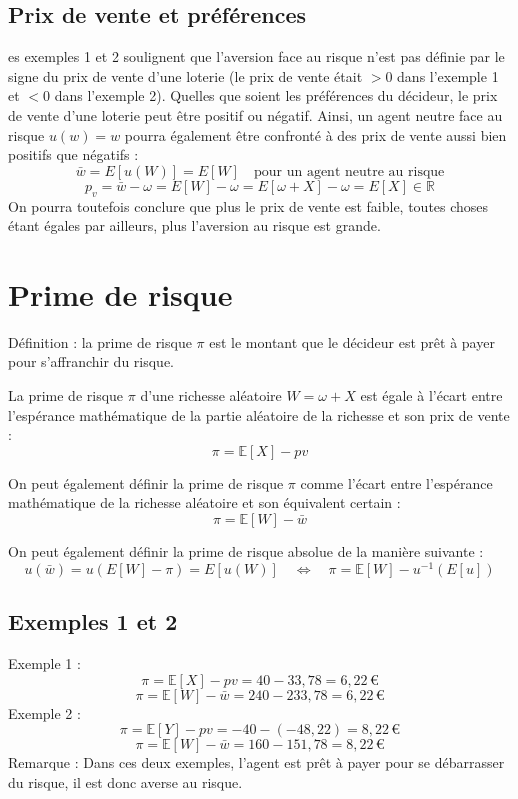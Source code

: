 \documentclass[a4paper, 12pt]{report}
\begin{document}
\subsection{Prix de vente et préférences}

es exemples 1 et 2 soulignent que l'aversion face au risque n'est pas définie par le signe du prix de vente d'une loterie (le prix de vente était \( > 0 \) dans l'exemple 1 et \( < 0 \) dans l'exemple 2). Quelles que soient les préférences du décideur, le prix de vente d'une loterie peut être positif ou négatif. Ainsi, un agent neutre face au risque \( u(w) = w \) pourra également être confronté à des prix de vente aussi bien positifs que négatifs : 
\[
\bar{w} = E[u(W)] = E[W] \quad \text{pour un agent neutre au risque}
\]
\[
p_v = \bar{w} - \omega = E[W] - \omega = E[\omega + X] - \omega = E[X] \in \mathbb{R}
\]
On pourra toutefois conclure que plus le prix de vente est faible, toutes choses étant égales par ailleurs, plus l'aversion au risque est grande.

\section{Prime de risque}

Définition : la prime de risque \( \pi \) est le montant que le décideur est prêt à payer pour s'affranchir du risque.

La prime de risque \( \pi \) d'une richesse aléatoire \( W = \omega + X \) est égale à l'écart entre l'espérance mathématique de la partie aléatoire de la richesse et son prix de vente :
\[
\pi = \mathbb{E}[X] - pv
\]

On peut également définir la prime de risque \( \pi \) comme l'écart entre l'espérance mathématique de la richesse aléatoire et son équivalent certain :
\[
\pi = \mathbb{E}[W] - \bar{w}
\]

On peut également définir la prime de risque absolue de la manière suivante :
\[
u(\bar{w}) = u(E[W] - \pi) = E[u(W)] \quad \Leftrightarrow \quad \pi = \mathbb{E}[W] - u^{-1}\left( E[u]\right) 
\]

\subsection{Exemples 1 et 2}
\noindent
Exemple 1 : 
\[
\pi = \mathbb{E}[X] - pv = 40 - 33,78 = 6,22\,\text{€} 
\]
\[
\pi = \mathbb{E}[W] - \bar{w} = 240 - 233,78 = 6,22\,\text{€} 
\]
\noindent
Exemple 2 : 
\[
\pi = \mathbb{E}[Y] - pv = -40 - (-48,22) = 8,22\,\text{€} 
\]
\[
\pi = \mathbb{E}[W] - \bar{w} = 160 - 151,78 = 8,22\,\text{€} 
\]
\noindent
Remarque : Dans ces deux exemples, l'agent est prêt à payer pour se débarrasser du risque, il est donc averse au risque.
\end{document}
